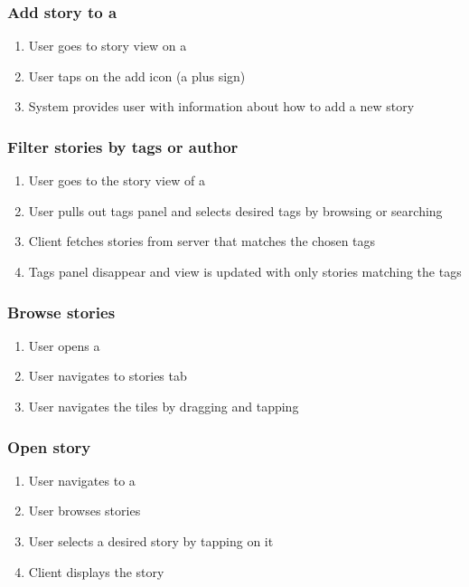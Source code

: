 \documentclass[11pt]{book}
\begin{document}
\subsubsection{Add story to a \wallentitys}
\begin{enumerate}
\item User goes to story view on a \wallentitys
\item User taps on the add icon (a plus sign)
\item System provides user with information about how to add a new story
\end{enumerate}

\subsubsection{Filter stories by tags or author}
\begin{enumerate}
\item User goes to the story view of a \wallentitys
\item User pulls out tags panel and selects desired tags by browsing or searching
\item Client fetches stories from server that matches the chosen tags
\item Tags panel disappear and \wallentitys view is updated with only stories matching the tags
\end{enumerate}

\subsubsection{Browse stories}
\begin{enumerate}
\item User opens a \wallentitys
\item User navigates to stories tab
\item User navigates the tiles by dragging and tapping
\end{enumerate}

\subsubsection{Open story}
\begin{enumerate}
\item User navigates to a \wallentitys
\item User browses stories
\item User selects a desired story by tapping on it
\item Client displays the story
\end{enumerate}
\end{document}
